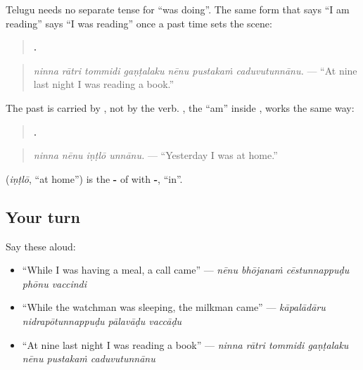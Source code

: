 \begin{grammarlens}[title={Grammar Lens: 'was doing' on its own}]
Telugu needs no separate tense for \textquotedblleft{}was doing\textquotedblright{}. The same form that says \textquotedblleft{}I am reading\textquotedblright{} says \textquotedblleft{}I was reading\textquotedblright{} once a past time sets the scene:

\begin{quote}
\textbf{      .}
\end{quote}

\begin{quote}
\emph{ninna rātri tommidi gaṇṭalaku nēnu pustakaṁ caduvutunnānu.} — \textquotedblleft{}At nine last night I was reading a book.\textquotedblright{}
\end{quote}

The past is carried by \textbf{ }, not by the verb. \textbf{}, the \textquotedblleft{}am\textquotedblright{} inside \textbf{}, works the same way:

\begin{quote}
\textbf{   .}
\end{quote}

\begin{quote}
\emph{ninna nēnu iṇṭlō unnānu.} — \textquotedblleft{}Yesterday I was at home.\textquotedblright{}
\end{quote}

\textbf{} (\emph{iṇṭlō}, \textquotedblleft{}at home\textquotedblright{}) is the \textbf{-} of \textbf{} with \textbf{-}, \textquotedblleft{}in\textquotedblright{}.
\end{grammarlens}

\subsection*{Your turn}
Say these aloud:

\begin{itemize}
\raggedright
  \item \textquotedblleft{}While I was having a meal, a call came\textquotedblright{} — \emph{nēnu bhōjanaṁ cēstunnappuḍu phōnu vaccindi}
  \item \textquotedblleft{}While the watchman was sleeping, the milkman came\textquotedblright{} — \emph{kāpalādāru nidrapōtunnappuḍu pālavāḍu vaccāḍu}
  \item \textquotedblleft{}At nine last night I was reading a book\textquotedblright{} — \emph{ninna rātri tommidi gaṇṭalaku nēnu pustakaṁ caduvutunnānu}
\end{itemize}

